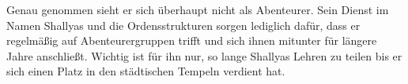 
Genau genommen sieht er sich überhaupt nicht als Abenteurer. Sein Dienst im Namen Shallyas und die Ordensstrukturen sorgen lediglich dafür, dass er regelmäßig auf Abenteurergruppen trifft und sich ihnen mitunter für längere Jahre anschließt.  
Wichtig ist für ihn nur, so lange Shallyas Lehren zu teilen bis er sich einen Platz in den städtischen Tempeln verdient hat. 
